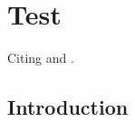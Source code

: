 \documentclass[onecolumn, letter paper]{report}
\begin{document}
\maketitle

\chapter{Test}

Citing \cite{Tedrake} and  \cite{di2020software}.

\section{Introduction}

\printbibliography[heading=bibintoc, title={Bibliography}]
\end{document}

